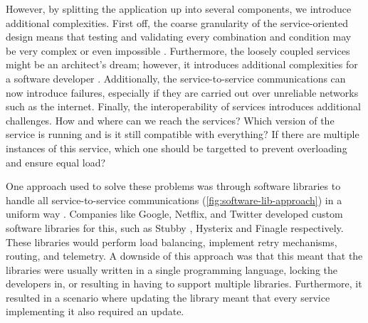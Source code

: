 However, by splitting the application up into several components, we introduce additional complexities. First off, the coarse granularity of the service-oriented design means that testing and validating every combination and condition may be very complex or even impossible \cite{mahmood2007service}. Furthermore, the loosely coupled services might be an architect's dream; however, it introduces additional complexities for a software developer \cite{fowler2012patterns}. Additionally, the service-to-service communications can now introduce failures, especially if they are carried out over unreliable networks such as the internet. Finally, the interoperability of services introduces additional challenges. How and where can we reach the services? Which version of the service is running and is it still compatible with everything? If there are multiple instances of this service, which one should be targetted to prevent overloading and ensure equal load? 



One approach used to solve these problems was through software libraries to handle all service-to-service communications (\cref{fig:software-lib-approach}) in a uniform way \cite{service-mesh-history}. Companies like Google, Netflix, and Twitter developed custom software libraries for this, such as Stubby \cite{stubby}, Hysterix \cite{hysterix} and Finagle \cite{finagle} respectively. These libraries would perform load balancing, implement retry mechanisms, routing, and telemetry. A downside of this approach was that this meant that the libraries were usually written in a single programming language, locking the developers in, or resulting in having to support multiple libraries. Furthermore, it resulted in a scenario where updating the library meant that every service implementing it also required an update. 



